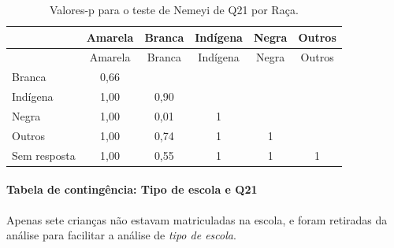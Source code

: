 \documentclass[]{article}
\let\oldparagraph\paragraph
\renewcommand{\paragraph}[1]{\oldparagraph{#1}\mbox{}}
\begin{document}
\begin{longtable}[]{@{}lccccc@{}}
\caption{\label{tab:unnamed-chunk-464}Valores-p para o teste de Nemeyi de Q21 por Raça.}\tabularnewline
\toprule
& Amarela & Branca & Indígena & Negra & Outros\tabularnewline
\midrule
\endfirsthead
\toprule
& Amarela & Branca & Indígena & Negra & Outros\tabularnewline
\midrule
\endhead
Branca & 0,66 & & & &\tabularnewline
Indígena & 1,00 & 0,90 & & &\tabularnewline
Negra & 1,00 & 0,01 & 1 & &\tabularnewline
Outros & 1,00 & 0,74 & 1 & 1 &\tabularnewline
Sem resposta & 1,00 & 0,55 & 1 & 1 & 1\tabularnewline
\bottomrule
\end{longtable}

\cleardoublepage

\hypertarget{tabela-de-continguxeancia-tipo-de-escola-e-q21}{%
\paragraph{Tabela de contingência: Tipo de escola e Q21}\label{tabela-de-continguxeancia-tipo-de-escola-e-q21}}

Apenas sete crianças não estavam matriculadas na escola, e foram retiradas da análise para facilitar a análise de \emph{tipo de escola}.
\end{document}

